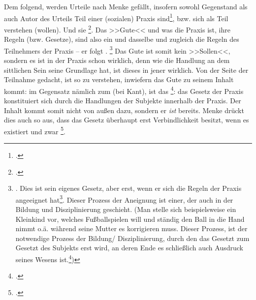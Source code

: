 \documentclass[12pt, a4paper, openany]{report}
\begin{document}
Dem folgend, werden Urteile nach Menke gefällt, insofern sowohl Gegenstand als auch Autor des Urteils Teil einer (sozialen) Praxis sind\footcite[Vgl.][28]{menke_autonomie_2018}, bzw. sich als Teil verstehen (wollen). 
Und sie \footcite[][S. 28 - S. 29]{menke_autonomie_2018}.
Das >>Gute<< und was die Praxis ist, ihre Regeln (bzw. Gesetze), sind also ein und dasselbe und zugleich die Regeln des Teilnehmers der Praxis -- er folgt .%
\footnote{
    \cite[][29]{menke_autonomie_2018}.
    Dies ist sein eigenes Gesetz, aber erst, wenn er sich die Regeln der Praxis angeeignet hat\footcite[Vgl.][32]{menke_autonomie_2018}.
    Dieser Prozess der Aneignung ist einer, der auch in der Bildung und Disziplinierung geschieht.
    (Man stelle sich beispielsweise ein Kleinkind vor, welches Fußballspielen will und ständig den Ball in die Hand nimmt o.ä. während seine Mutter es korrigieren muss. 
    Dieser Prozess, ist der notwendige Prozess der Bildung/ Disziplinierung, durch den das Gesetzt zum Gesetzt des Subjekts erst wird, an deren Ende es schließlich auch Ausdruck seines Wesens ist.\footcite[Vgl.][§ 147, S. 162]{hegel_grundlinien_2017})
}
Das Gute ist somit kein >>Sollen<<, sondern es ist in der Praxis schon wirklich, denn wie die Handlung an dem sittlichen Sein seine Grundlage hat, ist dieses in jener wirklich.
Von der Seite der Teilnahme gedacht, ist so zu verstehen, inwiefern das Gute zu seinem Inhalt kommt: 
im Gegensatz nämlich zum  (bei Kant), ist das \footcite[][§ 144, S. 161.]{hegel_grundlinien_2017}:
das Gesetz der Praxis konstituiert sich durch die Handlungen der Subjekte innerhalb der Praxis.
Der Inhalt kommt somit nicht von außen dazu, sondern er \emph{ist} bereits.
Menke drückt dies auch so aus, dass das Gesetz überhaupt erst Verbindlichkeit besitzt, wenn es existiert und zwar \footcite[][57]{menke_autonomie_2018}.
\end{document}
